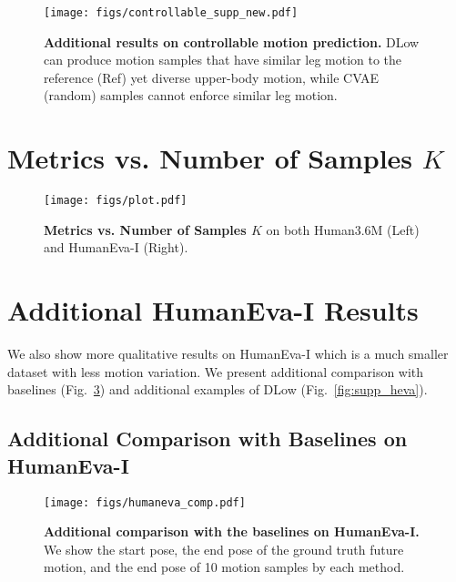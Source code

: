 \documentclass[runningheads]{llncs}
\begin{document}
\begin{figure}[ht!]
\vspace{-7mm}
    \centering
    \texttt{[image: figs/controllable\_supp\_new.pdf]}
    \vspace{-3mm}
    \caption{\textbf{Additional results on controllable motion prediction.} DLow can produce motion samples that have similar leg motion to the reference (Ref) yet diverse upper-body motion, while CVAE (random) samples cannot enforce similar leg motion.}
    \label{fig:control_supp}
    \vspace{-10mm}
\end{figure}

\clearpage
\section{Metrics vs. Number of Samples $K$}
\label{sec:metrics_vs_k}
\begin{figure}[ht!]
    \vspace{-5mm}
    \centering
    \texttt{[image: figs/plot.pdf]}
    \caption{\textbf{Metrics vs. Number of Samples $K$} on both Human3.6M (Left) and HumanEva-I (Right).}
    \label{fig:metrics}
    \vspace{-5mm}
\end{figure}



\clearpage
\section{Additional HumanEva-I Results}
We also show more qualitative results on HumanEva-I which is a much smaller dataset with less motion variation. We present additional comparison with baselines (Fig.~\ref{fig:supp_heva_comp}) and additional examples of DLow (Fig.~\ref{fig:supp_heva}).
\subsection{Additional Comparison with Baselines on HumanEva-I}
\begin{figure}[ht!]
    \vspace{-5mm}
    \centering
    \texttt{[image: figs/humaneva\_comp.pdf]}
    \vspace{-5mm}
    \caption{\textbf{Additional comparison with the baselines on HumanEva-I.} We show the start pose, the end pose of the ground truth future motion, and the end pose of 10 motion samples by each method.}
    \label{fig:supp_heva_comp}
    \vspace{-5mm}
\end{figure}
\end{document}
